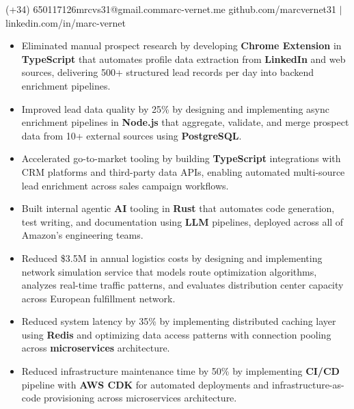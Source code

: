 \documentclass[10pt,a4paper]{article}
\begin{document}
  {(+34) 650117126}{mrcvs31@gmail.com}{marc-vernet.me}
  {github.com/marcvernet31 \quad $|$ \quad linkedin.com/in/marc-vernet}


\begin{itemize}[topsep=0pt]
  \item Eliminated manual prospect research by developing \textbf{Chrome Extension} in \textbf{TypeScript} that automates profile data extraction from \textbf{LinkedIn} and web sources, delivering 500+ structured lead records per day into backend enrichment pipelines.
  \item Improved lead data quality by 25\% by designing and implementing async enrichment pipelines in \textbf{Node.js} that aggregate, validate, and merge prospect data from 10+ external sources using \textbf{PostgreSQL}.
  \item Accelerated go-to-market tooling by building \textbf{TypeScript} integrations with CRM platforms and third-party data APIs, enabling automated multi-source lead enrichment across sales campaign workflows.
\end{itemize}
\vspace{0.15em}

\begin{itemize}[topsep=0pt]
  \item Built internal agentic \textbf{AI} tooling in \textbf{Rust} that automates code generation, test writing, and documentation using \textbf{LLM} pipelines, deployed across all of Amazon's engineering teams.
  \item Reduced \$3.5M in annual logistics costs by designing and implementing network simulation service that models route optimization algorithms, analyzes real-time traffic patterns, and evaluates distribution center capacity across European fulfillment network.
  \item Reduced system latency by 35\% by implementing distributed caching layer using \textbf{Redis} and optimizing data access patterns with connection pooling across \textbf{microservices} architecture.
  \item Reduced infrastructure maintenance time by 50\% by implementing \textbf{CI/CD} pipeline with \textbf{AWS CDK} for automated deployments and infrastructure-as-code provisioning across microservices architecture.
\end{itemize}
\vspace{0.15em}
\end{document}
